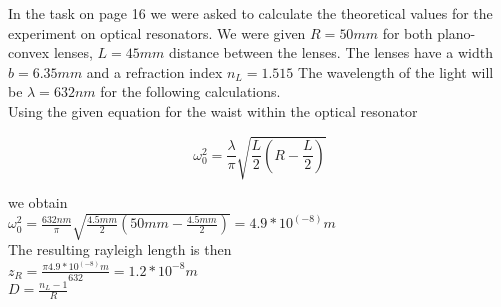 \documentclass{article}
\begin{document}
 In the task on page 16 we were asked to calculate the theoretical values for the experiment on optical resonators. We were given $R=50mm$ for both plano-convex lenses, $L=45mm$ distance between the lenses. The lenses have a width $b=6.35mm$ and a refraction index $n_{L} = 1.515$ The wavelength of the light will be $\lambda = 632nm$ for the following calculations.\\

 Using the given equation for the waist within the optical resonator

\begin{equation}
\omega_{0}^2 = \frac{\lambda}{\pi}\sqrt{\frac{L}{2}(R-\frac{L}{2})}
\label{omegawithinres}
\end{equation}

we obtain\\

$\omega_{0}^2 = \frac{632nm}{\pi}\sqrt{\frac{4.5mm}{2}(50mm-\frac{4.5mm}{2})} = 4.9*10^(-8) m$\\

The resulting rayleigh length is then\\

$z_{R} = \frac{\pi4.9*10^(-8) m}{632} = 1.2*10^{-8} m$\\

$D = \frac{n_{L}-1}{R}$
\end{document}
